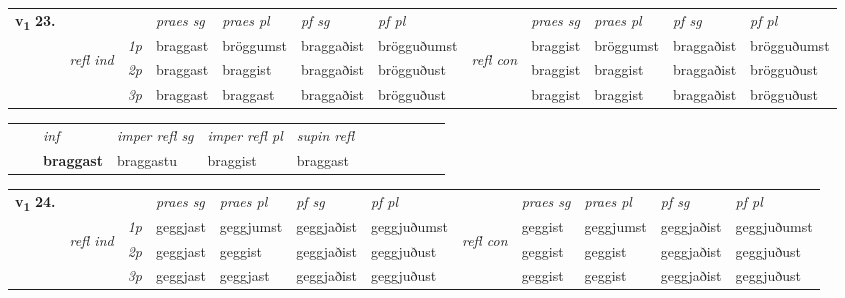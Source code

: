 \begin{tabular}{llllllllllll} \toprule
\multirow{4}{*}{{{\textbf{v{\textsubscript{1}}} \Large{\textbf{23.}}}}}  & &   &  \textit{praes sg}  & \textit{praes pl}  &\textit{pf sg} & \textit{pf pl} &  &  \textit{praes sg}  & \textit{praes pl}  & \textit{pf sg} & \textit{pf pl } \\*
	\cmidrule{4-7} \cmidrule{9-12}
 &\multirow{3}{*}{\begin{turn}{90}\textit{refl ind}\end{turn}} & {\textit{1p}} & braggast & bröggumst    & braggaðist & brögguðumst & \multirow{3}{*}{\begin{turn}{90}\textit{refl con}\end{turn}}  &braggist & bröggumst & braggaðist & brögguðumst\\*
 &&  {\textit{2p}} &  braggast  & braggist   & braggaðist & brögguðust & &braggist & braggist & braggaðist & brögguðust \\*
& &  {\textit{3p}} & braggast & braggast   & braggaðist & brögguðust & & braggist & braggist& braggaðist & brögguðust  \\*
\cmidrule{4-7} \cmidrule{9-12}
\end{tabular}


\begin{tabular}{llllllllllll}
 & & \textit{inf}   & \textit{imper refl sg} & \textit{imper refl pl}   & \textit{supin refl}      \\*
  & & \textbf{braggast}    & braggastu & braggist   & braggast  \\*
\cmidrule{1-12}
\end{tabular}



\begin{tabular}{llllllllllll} \toprule
\multirow{4}{*}{{{\textbf{v{\textsubscript{1}}} \Large{\textbf{24.}}}}}  & &   &  \textit{praes sg}  & \textit{praes pl}  &\textit{pf sg} & \textit{pf pl} &  &  \textit{praes sg}  & \textit{praes pl}  & \textit{pf sg} & \textit{pf pl } \\*
	\cmidrule{4-7} \cmidrule{9-12}
 &\multirow{3}{*}{\begin{turn}{90}\textit{refl ind}\end{turn}} & {\textit{1p}} & geggjast & geggjumst    & geggjaðist & geggjuðumst & \multirow{3}{*}{\begin{turn}{90}\textit{refl con}\end{turn}}  &geggist & geggjumst & geggjaðist & geggjuðumst\\*
 &&  {\textit{2p}} &  geggjast  & geggist   & geggjaðist & geggjuðust & &geggist & geggist & geggjaðist & geggjuðust \\*
& &  {\textit{3p}} & geggjast & geggjast   & geggjaðist & geggjuðust & & geggist & geggist& geggjaðist & geggjuðust  \\*
\cmidrule{4-7} \cmidrule{9-12}
\end{tabular}


